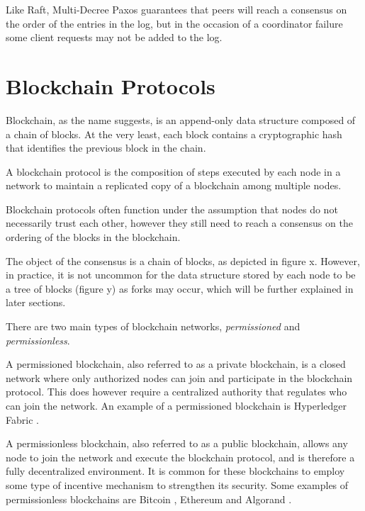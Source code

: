 \vspace{0.5cm}

Like Raft, Multi-Decree Paxos guarantees that peers will reach a consensus on the order of the entries in the log, but in the occasion of a coordinator failure some client requests may not be added to the log.




\section{Blockchain Protocols}

Blockchain, as the name suggests, is an append-only data structure composed of a chain of blocks. At the very least, each block contains a cryptographic hash that identifies the previous block in the chain.

\vspace{0.5cm}

A blockchain protocol is the composition of steps executed by each node in a network to maintain a replicated copy of a blockchain among multiple nodes. 

Blockchain protocols often function under the assumption that nodes do not necessarily trust each other, however they still need to reach a consensus on the ordering of the blocks in the blockchain.

The object of the consensus is a chain of blocks, as depicted in figure x. However, in practice, it is not uncommon for the data structure stored by each node to be a tree of blocks (figure y) as forks may occur, which will be further explained in later sections.


\vspace{0.5cm}

There are two main types of blockchain networks, \textit{permissioned} and \textit{permissionless}.

A permissioned blockchain, also referred to as a private blockchain, is a closed network where only authorized nodes can join and participate in the blockchain protocol. This does however require a centralized authority that regulates who can join the network. An example of a permissioned blockchain is Hyperledger Fabric \cite{hyperledger_fabric}.

A permissionless blockchain, also referred to as a public blockchain, allows any node to join the network and execute the blockchain protocol, and is therefore a fully decentralized environment. It is common for these blockchains to employ some type of incentive mechanism to strengthen its security. Some examples of permissionless blockchains are Bitcoin \cite{bitcoin}, Ethereum \cite{ethereum_whitepaper} and Algorand \cite{algorand_scale_byz_agreements}.

